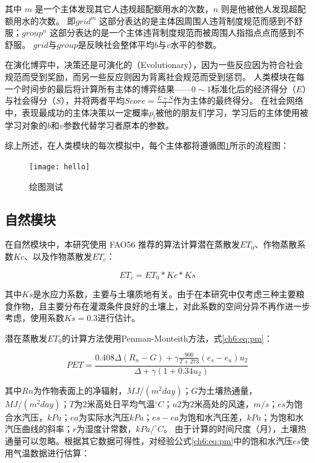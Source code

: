 其中 $m$ 是一个主体发现其它人违规超配额用水的次数，$n$ 则是他被他人发现超配额用水的次数。
即$grid^m$ 这部分表达的是主体因周围人违背制度规范而感到不舒服；$group^n$ 这部分表达的是一个主体违背制度规范而被周围人指指点点而感到不舒服。
$grid$与$group$是反映社会整体平均$b$与$v$水平的参数。

在演化博弈中，决策还是可演化的（Evolutionary），因为一些反应因为符合社会规范而受到奖励，而另一些反应则因为背离社会规范而受到惩罚。
人类模块在每一个时间步的最后将计算所有主体的博弈结果——$0 \sim 1$标准化后的经济得分（$E$）与社会得分（$S$），并将两者平均$Score = \frac{E + S}{2}$作为主体的最终得分。
在社会网络中，表现最成功的主体决策以一定概率$p_{l}$被他的朋友们学习，学习后的主体使用被学习对象的$b$和$v$参数代替学习者原本的参数。

综上所述，在人类模块的每次模拟中，每个主体都将遵循图\ref{ch6:fig:society}所示的流程图：

\begin{figure}[htb]
    \centering
    \texttt{[image: hello]}
    \caption{绘图测试}\label{ch6:fig:society}
\end{figure}

\subsection{自然模块}

在自然模块中，本研究使用 FAO56 推荐的算法计算潜在蒸散发$ET_0$、作物蒸散系数$Kc$、以及作物蒸散发$ET_c$：

\begin{equation}
    ET_c = ET_0 * Kc * Ks
\end{equation}

其中$Ks$是水应力系数，主要与土壤质地有关。由于在本研究中仅考虑三种主要粮食作物，且主要分布在灌溉条件良好的土壤上，对此系数的空间分异不再作进一步考虑，使用系数$Ks = 0.3$进行估计。  %

潜在蒸散发$ET_0$的计算方法使用Penman-Monteith方法，式\ref{ch6:eq:pm}：

\begin{equation}
    \label{ch6:eq:pm}
    PET = \frac{0.408 \Delta (R_{n}-G)+\gamma \frac{900}{T+273}
    (e_s-e_a) u_2}{\Delta+\gamma(1+0.34 u_2)}
\end{equation}

其中$Rn$为作物表面上的净辐射，$MJ/(m^2 day)$；$G$为土壤热通量，$MJ/(m^2 day)$；$T$为$2$米高处日平均气温$^\circ C$；$u2$为$2$米高处的风速，$m/s$；$es$为饱合水汽压，$kPa$；$ea$为实际水汽压$kPa$；$es - ea$为饱和水汽压差，$kPa$；为饱和水汽压曲线的斜率；$r$为湿度计常数，$kPa/^\circ C$。
由于计算的时间尺度（月），土壤热通量可以忽略。根据其它数据可得性，对经验公式\ref{ch6:eq:pm}中的饱和水汽压$es$使用气温数据进行估算：

